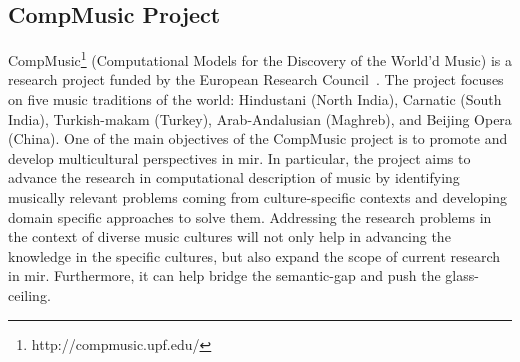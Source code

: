 %

\subsection{CompMusic Project}
\label{sec:intro_motivation_compmusic}



%

CompMusic\footnote{http://compmusic.upf.edu/} (Computational Models for the Discovery of the World'd Music) is a research project funded by the European Research Council~\citep{XavierSerra2011}. The project focuses on five music traditions of the world: Hindustani (North India), Carnatic (South India), Turkish-makam (Turkey), Arab-Andalusian (Maghreb), and Beijing Opera (China). One of the main objectives of the CompMusic project is to promote and develop multicultural perspectives in \gls{mir}. In particular, the project aims to advance the research in computational description of music by identifying musically relevant problems coming from culture-specific contexts and developing domain specific approaches to solve them. Addressing the research problems in the context of diverse music cultures will not only help in advancing the knowledge in the specific cultures, but also expand the scope of current research in \gls{mir}. Furthermore, it can help bridge the semantic-gap and push the glass-ceiling. 

